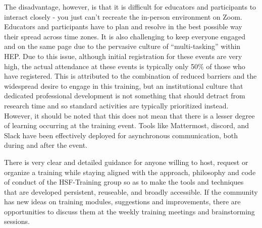 \documentclass[twocolumn]{svjour3}          %
\begin{document}
The disadvantage, however, is that it is difficult for educators and participants to interact closely - you just can’t recreate the in-person environment on Zoom. Educators and participants have to plan and resolve in the best possible way their spread across time zones. It is also challenging to keep everyone engaged and on the same page due to the pervasive culture of ``multi-tasking'' within HEP. Due to this issue, although initial registration for these events are very high, the actual attendance at these events is typically only 50\% of those who have registered. This is attributed to the combination of reduced barriers and the widespread desire to engage in this training, but an institutional culture that dedicated professional development is not something that should detract from research time and so standard activities are typically prioritized instead.  However, it should be noted that this does not mean that there is a lesser degree of learning occurring at the training event. Tools like Mattermost, discord, and Slack have been effectively deployed for asynchronous communication, both during and after the event. 

There is very clear and detailed guidance for anyone willing to host, request or organize a training while staying aligned with the approach, philosophy and code of conduct of the HSF-Training group so as to make the tools and techniques that are developed persistent, reuseable, and broadly accessible. If the community has new ideas on training modules, suggestions and improvements, there are opportunities to discuss them at the weekly training meetings and brainstorming sessions.
%
\end{document}
